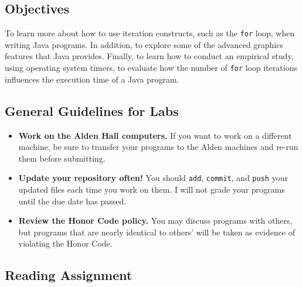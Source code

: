 



\vspace{-0.2in}
\subsection*{Objectives}
\vspace{-0.05in}

To learn more about how to use iteration constructs, such as the {\tt for} loop, when writing Java programs. In
addition, to explore some of the advanced graphics features that Java provides.  Finally, to learn how to conduct an
empirical study, using operating system timers, to evaluate how the number of {\tt for} loop iterations influences the
execution time of a Java program.

\vspace{-0.15in}
\subsection*{General Guidelines for Labs}
\vspace{-0.05in}

\begin{itemize}
\item
{\bf Work on the Alden Hall computers.} If you want to work on a different
machine, be sure to transfer your programs to the Alden
machines and re-run them before submitting.
\item
  {\bf Update your repository often!} You should {\tt add}, {\tt commit}, 
  and {\tt push} your updated files each time you work on them.  I will not grade 
your programs until the due date has passed.
\item
{\bf Review the Honor Code policy.} You
may discuss programs with others, but programs that are nearly identical
to others' will be taken as evidence of violating the Honor Code.
\end{itemize}

\vspace{-0.25in}
\subsection*{Reading Assignment}
\vspace{-0.05in}

